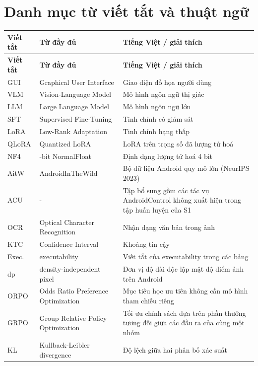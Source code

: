 \chapter*{Danh mục từ viết tắt và thuật ngữ}

\renewcommand{\arraystretch}{1.35}
\begin{longtable}{@{}>{\raggedright\arraybackslash}p{2.6cm}>{\raggedright\arraybackslash}p{5.4cm}>{\raggedright\arraybackslash}p{6.2cm}@{}}
\toprule
\textbf{Viết tắt} & \textbf{Từ đầy đủ} & \textbf{Tiếng Việt / giải thích} \\
\midrule
\endfirsthead
\toprule
\textbf{Viết tắt} & \textbf{Từ đầy đủ} & \textbf{Tiếng Việt / giải thích} \\
\midrule
\endhead
GUI & Graphical User Interface & Giao diện đồ họa người dùng \\
VLM & Vision-Language Model & Mô hình ngôn ngữ thị giác \\
LLM & Large Language Model & Mô hình ngôn ngữ lớn \\
SFT & Supervised Fine-Tuning & Tinh chỉnh có giám sát \\
LoRA & Low-Rank Adaptation & Tinh chỉnh hạng thấp \\
QLoRA & Quantized LoRA & LoRA trên trọng số đã lượng tử hoá \\
NF4 & 4-bit NormalFloat & Định dạng lượng tử hoá 4 bit \\
AitW & AndroidInTheWild & Bộ dữ liệu Android quy mô lớn (NeurIPS 2023) \\
ACU & - & Tập bổ sung gồm các tác vụ AndroidControl không xuất hiện trong tập huấn luyện của S1 \\
OCR & Optical Character Recognition & Nhận dạng văn bản trong ảnh \\
KTC & Confidence Interval & Khoảng tin cậy \\
Exec. & executability & Viết tắt của executability trong các bảng \\
dp & density-independent pixel & Đơn vị độ dài độc lập mật độ điểm ảnh trên Android \\
ORPO & Odds Ratio Preference Optimization & Mục tiêu học ưu tiên không cần mô hình tham chiếu riêng \\
GRPO & Group Relative Policy Optimization & Tối ưu chính sách dựa trên phần thưởng tương đối giữa các đầu ra của cùng một nhóm \\
KL & Kullback-Leibler divergence & Độ lệch giữa hai phân bố xác suất \\

\end{longtable}
